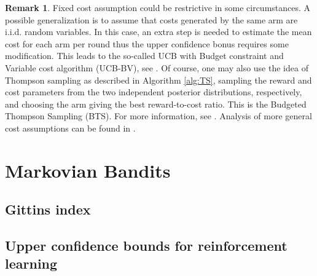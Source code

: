 \documentclass[10pt, openright]{book}
\numberwithin{equation}{section}
\theoremstyle{plain}
\theoremstyle{definition}
\newtheorem{Rem}[Th]{Remark}
\begin{document}
\begin{Rem}
Fixed cost assumption could be restrictive in some circumstances. A possible generalization is to assume that costs generated by the same arm are i.i.d. random variables. In this case, an extra step is needed to estimate the mean cost for each arm per round thus the upper confidence bonus requires some modification. This leads to the so-called UCB with Budget constraint and Variable cost algorithm (UCB-BV),  see \cite{ding2013multi}. Of course, one may also use the idea of Thompson sampling as described in Algorithm \ref{alg:TS}, sampling the reward and cost parameters from the two independent posterior distributions, respectively, and choosing the arm giving the best reward-to-cost ratio. This is the Budgeted Thompson Sampling (BTS). For more information, see \cite{xia2015thompson}. Analysis of more general cost assumptions can be found in \cite{cayci2020budget}.  
\end{Rem}


 
\chapter{Markovian Bandits}\label{ch:5}

\section{Gittins index}

\section{Upper confidence bounds for reinforcement learning}



 

\newpage

\printbibliography

 
 
\end{document}
